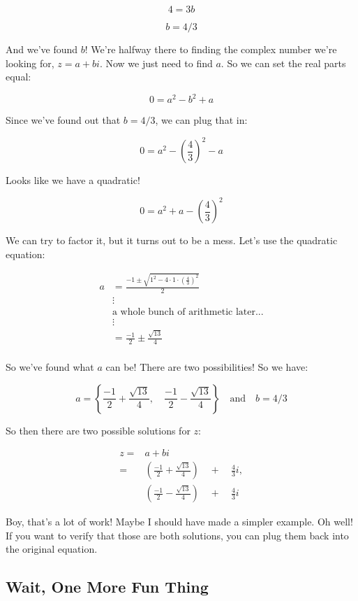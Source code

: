 \documentclass[
]{article}
\begin{document}
\[4 = 3b\]

\[b = 4/3\]

And we've found \(b\)! We're halfway there to finding the complex number
we're looking for, \(z=a+bi\). Now we just need to find \(a\). So we can
set the real parts equal:

\[0 = a^2 - b^2 + a\]

Since we've found out that \(b=4/3\), we can plug that in:

\[0 = a^2 - \left(\frac{4}{3}\right)^2 - a\]

Looks like we have a quadratic!

\[0 = a^2 + a - \left(\frac{4}{3}\right)^2\]

We can try to factor it, but it turns out to be a mess. Let's use the
quadratic equation:

\[
\begin{align*}
a &= \frac{-1 \pm \sqrt{1^2- 4\cdot1\cdot \left(\frac{4}{3}\right)^2 }}{2} \\
&\vdots \\
&\text{a whole bunch of arithmetic later...} \\
&\vdots \\
&= \frac{-1}{2} \pm\frac{\sqrt{13}}{4} \\
\end{align*}
\]

So we've found what \(a\) can be! There are two possibilities! So we
have:

\[a= \left\{\frac{-1}{2} +\frac{\sqrt{13}}{4} , \quad \frac{-1}{2} -\frac{\sqrt{13}}{4} \right\}\quad\text{and}\quad b=4/3\]

So then there are two possible solutions for \(z\):

\[
\begin{align*}
z =& a+bi \\
= &\left(\frac{-1}{2} +\frac{\sqrt{13}}{4}\right)  \quad+\quad\frac43i ,\\
&\left(\frac{-1}{2} -\frac{\sqrt{13}}{4} \right) \quad+\quad\frac43i 
\end{align*}
\]

Boy, that's a lot of work! Maybe I should have made a simpler example.
Oh well! If you want to verify that those are both solutions, you can
plug them back into the original equation.

\hypertarget{wait-one-more-fun-thing}{%
\subsection{Wait, One More Fun Thing}\label{wait-one-more-fun-thing}}
\end{document}
